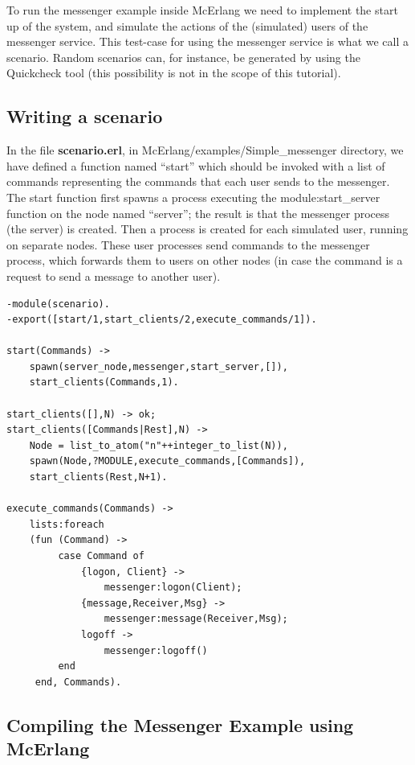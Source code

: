 \documentclass[a4paper]{article}
\newcommand{\simplemessengerdir}{McErlang/examples/Simple\_messenger\xspace}
\begin{document}
To run the messenger example inside McErlang we need to implement the
start up of the system, and simulate the actions of the (simulated)
users of the messenger service. This test-case for using the messenger
service is what we call a scenario. Random scenarios
can, for instance, be generated by using the Quickcheck 
tool (this possibility is not in the scope of this tutorial).

\subsection{Writing a scenario}

In the file {\bf scenario.erl}, in \simplemessengerdir directory, we
have defined a function named ``start'' which should be invoked with a
list of commands representing the commands that each user sends to the
messenger. The start function first spawns a process executing the
module:start\_server function on the node named ``server''; the result
is that the messenger process (the server) is created. Then a process
is created for each simulated user, running on separate nodes.  These
user processes send commands to the messenger process, which forwards
them to users on other nodes (in case the command is a request to send
a message to another user).

\begin{verbatim}
-module(scenario).
-export([start/1,start_clients/2,execute_commands/1]).

start(Commands) ->
    spawn(server_node,messenger,start_server,[]),
    start_clients(Commands,1).

start_clients([],N) -> ok;
start_clients([Commands|Rest],N) ->
    Node = list_to_atom("n"++integer_to_list(N)),
    spawn(Node,?MODULE,execute_commands,[Commands]),
    start_clients(Rest,N+1).

execute_commands(Commands) ->
    lists:foreach
    (fun (Command) ->
         case Command of
             {logon, Client} ->
                 messenger:logon(Client);
             {message,Receiver,Msg} ->
                 messenger:message(Receiver,Msg);
             logoff ->
                 messenger:logoff()
         end
     end, Commands).
\end{verbatim}

\subsection{Compiling the Messenger Example using McErlang}
\end{document}
